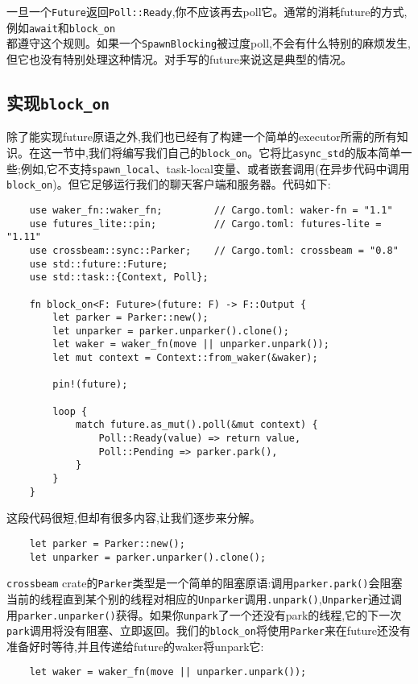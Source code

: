 一旦一个\texttt{Future}返回\texttt{Poll::Ready},你不应该再去poll它。通常的消耗future的方式,例如\texttt{await}和\texttt{block\_on}\\
都遵守这个规则。如果一个\texttt{SpawnBlocking}被过度poll,不会有什么特别的麻烦发生,但它也没有特别处理这种情况。对手写的future来说这是典型的情况。

\subsection{实现\texttt{block\_on}}
除了能实现future原语之外,我们也已经有了构建一个简单的executor所需的所有知识。在这一节中,我们将编写我们自己的\texttt{block\_on}。它将比\texttt{async\_std}的版本简单一些;例如,它不支持\texttt{spawn\_local}、task-local变量、或者嵌套调用(在异步代码中调用\texttt{block\_on})。但它足够运行我们的聊天客户端和服务器。代码如下:
\begin{verbatim}
    use waker_fn::waker_fn;         // Cargo.toml: waker-fn = "1.1"
    use futures_lite::pin;          // Cargo.toml: futures-lite = "1.11"
    use crossbeam::sync::Parker;    // Cargo.toml: crossbeam = "0.8"
    use std::future::Future;
    use std::task::{Context, Poll};

    fn block_on<F: Future>(future: F) -> F::Output {
        let parker = Parker::new();
        let unparker = parker.unparker().clone();
        let waker = waker_fn(move || unparker.unpark());
        let mut context = Context::from_waker(&waker);

        pin!(future);

        loop {
            match future.as_mut().poll(&mut context) {
                Poll::Ready(value) => return value,
                Poll::Pending => parker.park(),
            }
        }
    }
\end{verbatim}

这段代码很短,但却有很多内容,让我们逐步来分解。

\begin{verbatim}
    let parker = Parker::new();
    let unparker = parker.unparker().clone();
\end{verbatim}

\texttt{crossbeam} crate的\texttt{Parker}类型是一个简单的阻塞原语:调用\texttt{parker.park()}会阻塞当前的线程直到某个别的线程对相应的\texttt{Unparker}调用\texttt{.unpark()},\texttt{Unparker}通过调用\texttt{parker.unparker()}获得。如果你\texttt{unpark}了一个还没有park的线程,它的下一次\texttt{park}调用将没有阻塞、立即返回。我们的\texttt{block\_on}将使用\texttt{Parker}来在future还没有准备好时等待,并且传递给future的waker将unpark它:
\begin{verbatim}
    let waker = waker_fn(move || unparker.unpark());
\end{verbatim}


